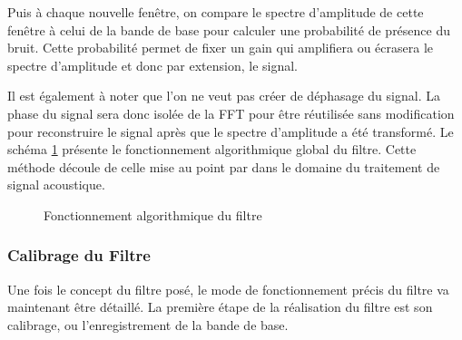 \documentclass[letterpaper, twoside, 12pt, memoire, creativecommons, hyperref]{thETS}
\begin{document}
Puis à chaque nouvelle fenêtre, on compare le spectre d'amplitude de cette fenêtre à celui de la bande de base pour calculer une probabilité de présence du bruit. Cette probabilité permet de fixer un gain qui amplifiera ou écrasera le spectre d'amplitude et donc par extension, le signal.

Il est également à noter que l'on ne veut pas créer de déphasage du signal. La phase du signal sera donc isolée de la FFT pour être réutilisée sans modification pour reconstruire le signal après que le spectre d'amplitude a été transformé. Le schéma \ref{fig:filtre} présente le fonctionnement algorithmique global du filtre. Cette méthode découle de celle mise au point par \cite{plapous2006} dans le domaine du traitement de signal acoustique.

\begin{figure}
	\centering
	\caption{Fonctionnement algorithmique du filtre}
	\label{fig:filtre}
\end{figure}

\subsubsection{Calibrage du Filtre}

Une fois le concept du filtre posé, le mode de fonctionnement précis du filtre va maintenant être détaillé. La première étape de la réalisation du filtre est son calibrage, ou l'enregistrement de la bande de base. 
\end{document}
